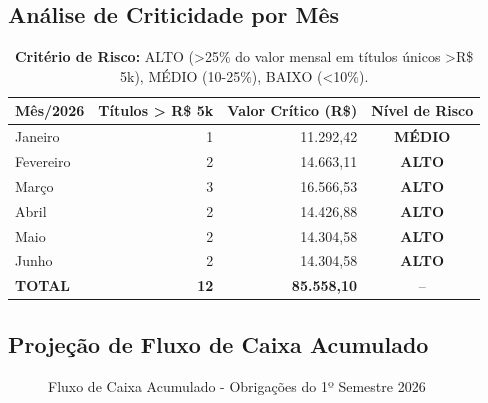 \documentclass[12pt, a4paper]{article}
\begin{document}
\newpage

\subsection{Análise de Criticidade por Mês}

\begin{table}[H]
    \centering
    \renewcommand{\arraystretch}{1.4}
    \begin{tabularx}{\textwidth}{X r r c}
        \toprule
        \rowcolor{tableHeader} \textbf{Mês/2026} & \textbf{Títulos > R\$ 5k} & \textbf{Valor Crítico (R\$)} & \textbf{Nível de Risco} \\
        \midrule
        Janeiro & 1 & 11.292,42 & \cellcolor{orange!30} \textbf{MÉDIO} \\
        Fevereiro & 2 & 14.663,11 & \cellcolor{accentColor!30} \textbf{ALTO} \\
        Março & 3 & 16.566,53 & \cellcolor{accentColor!30} \textbf{ALTO} \\
        Abril & 2 & 14.426,88 & \cellcolor{accentColor!30} \textbf{ALTO} \\
        Maio & 2 & 14.304,58 & \cellcolor{accentColor!30} \textbf{ALTO} \\
        Junho & 2 & 14.304,58 & \cellcolor{accentColor!30} \textbf{ALTO} \\
        \midrule
        \rowcolor{lightGray} \textbf{TOTAL} & \textbf{12} & \textbf{85.558,10} & -- \\
        \bottomrule
    \end{tabularx}
    \caption*{\footnotesize \textbf{Critério de Risco:} ALTO (>25\% do valor mensal em títulos únicos >R\$ 5k), MÉDIO (10-25\%), BAIXO (<10\%).}
\end{table}

\subsection{Projeção de Fluxo de Caixa Acumulado}

\begin{figure}[H]
    \centering
    \caption{Fluxo de Caixa Acumulado - Obrigações do 1º Semestre 2026}
\end{figure}
\pagebreak
\end{document}
